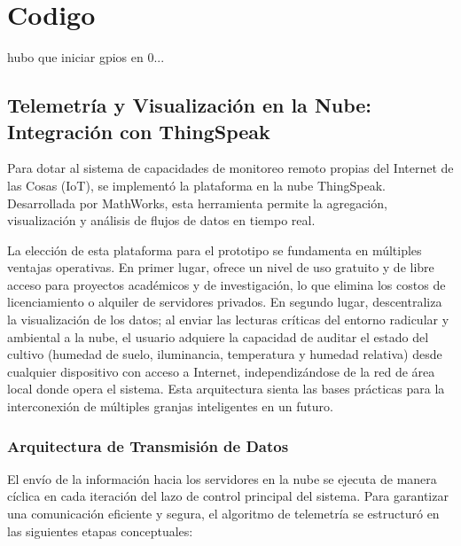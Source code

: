 \section{Codigo}
hubo que iniciar gpios en 0...

\subsection{Telemetría y Visualización en la Nube: Integración con ThingSpeak}
Para dotar al sistema de capacidades de monitoreo remoto propias del Internet de las Cosas (IoT), se implementó la plataforma en la nube ThingSpeak. Desarrollada por MathWorks, esta herramienta permite la agregación, visualización y análisis de flujos de datos en tiempo real. 

La elección de esta plataforma para el prototipo se fundamenta en múltiples ventajas operativas. En primer lugar, ofrece un nivel de uso gratuito y de libre acceso para proyectos académicos y de investigación, lo que elimina los costos de licenciamiento o alquiler de servidores privados. En segundo lugar, descentraliza la visualización de los datos; al enviar las lecturas críticas del entorno radicular y ambiental a la nube, el usuario adquiere la capacidad de auditar el estado del cultivo (humedad de suelo, iluminancia, temperatura y humedad relativa) desde cualquier dispositivo con acceso a Internet, independizándose de la red de área local donde opera el sistema. Esta arquitectura sienta las bases prácticas para la interconexión de múltiples granjas inteligentes en un futuro.

\subsubsection{Arquitectura de Transmisión de Datos}

El envío de la información hacia los servidores en la nube se ejecuta de manera cíclica en cada iteración del lazo de control principal del sistema. Para garantizar una comunicación eficiente y segura, el algoritmo de telemetría se estructuró en las siguientes etapas conceptuales:

